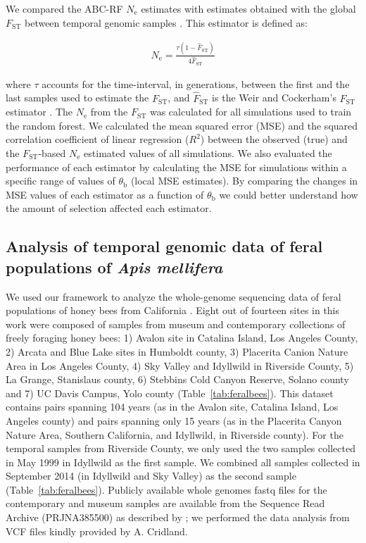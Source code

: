 \documentclass[a4paper, 12pt]{article}
\begin{document}
We compared the ABC-RF $N_\mathrm{e}$ estimates with estimates obtained with the global $F_\mathrm{ST}$ between temporal genomic samples \citep{Frachon:2017fw}. This estimator is defined as:

\begin{gather*}
\hat N_\mathrm{e} = \frac{\tau(1-\hat F_\mathrm{ST})}{4\hat F_\mathrm{ST} } 
\end{gather*}

\noindent where $\tau$ accounts for the time-interval, in generations, between the first and the last samples used to estimate the $F_\mathrm{ST}$, and $\hat F_\mathrm{ST}$ is the Weir and Cockerham's $F_\mathrm{ST}$ estimator \citep{Weir:1984dx}. The $N_\mathrm{e}$ from the $F_\mathrm{ST}$ was calculated for all simulations used to train the random forest. We calculated the mean squared error (MSE) and the squared correlation coefficient of linear regression ($R^2$) between the observed (true) and the $F_\mathrm{ST}$-based $N_\mathrm{e}$ estimated values of all simulations. We also evaluated the performance of each estimator by calculating the MSE for simulations within a specific range of values of $\theta_\mathrm{b}$ (local MSE estimates). By comparing the changes in MSE values of each estimator as a function of $\theta_\mathrm{b}$ we could better understand how the amount of selection affected each estimator.

\subsection*{Analysis of temporal genomic data of feral populations of \textit{Apis mellifera}} 

We used our framework to analyze the whole-genome sequencing data of feral populations of honey bees from California \citep{Cridland:2018fx}. Eight out of fourteen sites in this work were composed of samples from museum and contemporary collections of freely foraging honey bees: 1) Avalon site in Catalina Island, Los Angeles County, 2) Arcata and Blue Lake sites in Humboldt county, 3) Placerita Canion Nature Area in Los Angeles County, 4) Sky Valley and Idyllwild in Riverside County, 5) La Grange, Stanislaus county, 6) Stebbins Cold Canyon Reserve, Solano county and 7) UC Davis Campus, Yolo county (Table~\ref{tab:feralbees}). This dataset contains pairs spanning 104 years (as in the Avalon site, Catalina Island, Los Angeles county) and pairs spanning only 15 years (as in the Placerita Canyon Nature Area, Southern California, and Idyllwild, in Riverside county). For the temporal samples from Riverside County, we only used the two samples collected in May 1999 in Idyllwild as the first sample. We combined all samples collected in September 2014 (in Idyllwild and Sky Valley) as the second sample (Table~\ref{tab:feralbees}). Publicly available whole genomes fastq files for the contemporary and museum samples are available from the Sequence Read Archive (PRJNA385500) as described by \citet{Cridland:2018fx}; we performed the data analysis from VCF files \citep[the same files used in][]{Cridland:2018fx} kindly provided by A. Cridland.
\end{document}
